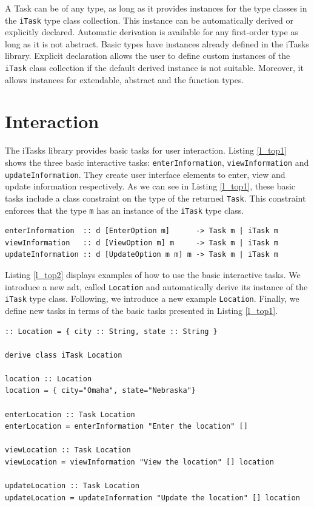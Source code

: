 A Task can be of any type, as long as it provides instances for the type classes in the \texttt{iTask} type class collection. This instance can be automatically derived or explicitly declared. Automatic derivation is available for any first-order type as long as it is not abstract. Basic types have instances already defined in the iTasks library. Explicit declaration allows the user to define custom instances of the \texttt{iTask} class collection if the default derived instance is not suitable. Moreover, it allows instances for extendable, abstract and the function types. 

\section{Interaction}\label{interaction}

The iTasks library provides basic tasks for user interaction. Listing \ref{l_top1} shows the three basic interactive tasks: \texttt{enterInformation}, \texttt{viewInformation} and \texttt{updateInformation}. They create user interface elements to enter, view and update information respectively. As we can see in Listing \ref{l_top1}, these basic tasks include a class constraint on the type of the returned \texttt{Task}. This constraint enforces that the type \texttt{m} has an instance of the \texttt{iTask} type class. 

\begin{lstlisting}[caption=iTasks basic interaction functions,captionpos=b,label=l_top1]
enterInformation  :: d [EnterOption m]      -> Task m | iTask m
viewInformation   :: d [ViewOption m] m     -> Task m | iTask m
updateInformation :: d [UpdateOption m m] m -> Task m | iTask m 
\end{lstlisting}


Listing \ref{l_top2} displays examples of how to use the basic interactive tasks. We introduce a new \ac{adt}, called \texttt{Location} and automatically derive its instance of the \texttt{iTask} type class. Following, we introduce a new example \texttt{Location}. Finally, we define new tasks in terms of the basic tasks presented in Listing \ref{l_top1}. 


\begin{lstlisting}[caption=Example of basic iTasks interaction functions,captionpos=b,label=l_top2]
:: Location = { city :: String, state :: String }

derive class iTask Location

location :: Location
location = { city="Omaha", state="Nebraska"}

enterLocation :: Task Location
enterLocation = enterInformation "Enter the location" []

viewLocation :: Task Location
viewLocation = viewInformation "View the location" [] location

updateLocation :: Task Location
updateLocation = updateInformation "Update the location" [] location
\end{lstlisting}

